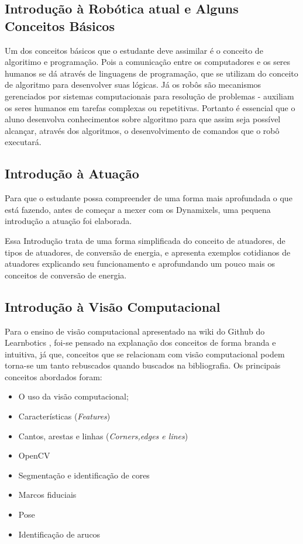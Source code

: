 \subsection{Introdução à Robótica atual e Alguns Conceitos Básicos}

Um dos conceitos básicos que o estudante deve assimilar é o conceito de algoritimo e programação. Pois a comunicação entre os computadores e os seres humanos se dá através de linguagens de programação, que se utilizam do conceito de algoritmo para desenvolver suas lógicas. Já os robôs são mecanismos gerenciados por sistemas computacionais para resolução de problemas - auxiliam os seres humanos em tarefas complexas ou repetitivas. Portanto é essencial que o aluno desenvolva conhecimentos sobre algoritmo para que assim seja possível alcançar, através dos algoritmos, o desenvolvimento de comandos que o robô executará.

\subsection{Introdução à Atuação}
Para que o estudante possa compreender de uma forma mais aprofundada o que está fazendo, antes de começar a mexer com os Dynamixels, uma pequena introdução a atuação foi elaborada.

Essa Introdução trata de uma forma simplificada do conceito de atuadores, de tipos de atuadores, de conversão de energia, e apresenta exemplos cotidianos de atuadores explicando seu funcionamento e aprofundando um pouco mais os conceitos de conversão de energia. \cite{tutAtua}

\subsection{Introdução à Visão Computacional}
Para o ensino de visão computacional apresentado na wiki do Github do Learnbotics \cite{wikilearn}, foi-se pensado na explanação dos conceitos de forma branda e intuitiva, já que, conceitos que se relacionam com visão computacional podem torna-se um tanto rebuscados quando buscados na bibliografia. Os principais conceitos abordados foram:
\begin{itemize}
	\item O uso da visão computacional;
	\item Características  (\textit{Features})
	\item Cantos, arestas e linhas (\textit{Corners,edges e lines})
	\item OpenCV
	\item Segmentação e identificação de cores
	\item Marcos fiduciais
	\item Pose
	\item Identificação de arucos
	
\end{itemize}

